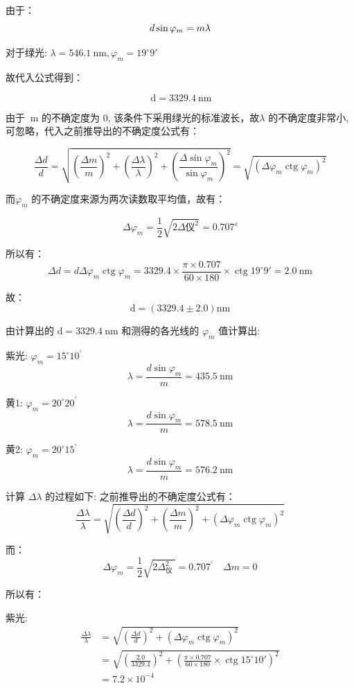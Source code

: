 \documentclass[UTF8]{ctexart}
\begin{document}
由于：
$$
d \sin \varphi_{m}=m \lambda \\
$$

对于绿光: $ \lambda=546.1 \mathrm{~nm}, \varphi_{m}=19^{\circ}9' $

故代入公式得到：

$$
\mathrm{~d}=3329.4 \mathrm{~nm}
$$

由于 $\mathrm{~m}$  的不确定度为  0, 该条件下采用绿光的标准波长，故$\lambda $ 的不确定度非常小, 可忽略，代入之前推导出的不确定度公式有：

$$
\frac{\Delta d}{d}=\sqrt{\left(\frac{\Delta m}{m}\right)^{2}+\left(\frac{\Delta \lambda}{\lambda}\right)^{2}+\left(\frac{\Delta \sin \varphi_{m}}{\sin \varphi_{m}}\right)^{2}}=\sqrt{\left(\Delta \varphi_{m} \operatorname{ctg} \varphi_{m}\right)^{2}}
$$

而$\varphi_m$ 的不确定度来源为两次读数取平均值，故有：

$$
\Delta \varphi_m = \frac{1}{2}\sqrt{{2\Delta \mbox{仪} }^2} = 0.707'
$$

所以有：
$$
   \Delta d=d \Delta \varphi_{m} \operatorname{ctg} \varphi_{m}=3329.4 \times \frac{\pi \times 0.707}{60 \times 180} \times \operatorname{ctg} 19^{\circ}9'=2.0 \mathrm{~nm} 
$$

故：
$$
  \mathrm{d}=(3329.4 \pm 2.0) \mathrm{nm}
$$

  由计算出的  $\mathrm{d}=3329.4 \mathrm{~nm}$  和测得的各光线的  $\varphi_{m} $ 值计算出:

  紫光: $\varphi_{m}=15^{\circ} 10^{\prime} $
  $$
  \lambda=\frac{d \sin \varphi_{m}}{m}=435.5 \mathrm{~nm}
  $$

  黄1: $\varphi_{m}=20^{\circ} 20^{\prime} $
  $$
  \lambda=\frac{d \sin \varphi_{m}}{m}=578.5 \mathrm{~nm}
  $$

  黄2: $\varphi_{m}=20^{\circ} 15^{\prime} $
  $$
  \lambda=\frac{d \sin \varphi_{m}}{m}=576.2 \mathrm{~nm}
  $$

  计算  $\Delta \lambda$  的过程如下:
  之前推导出的不确定度公式有：
   $$
   \frac{\Delta \lambda}{\lambda}=\sqrt{\left(\frac{\Delta d}{d}\right)^{2}+\left(\frac{\Delta m}{m}\right)^{2}+\left(\Delta \varphi_{m} \operatorname{ctg} \varphi_{m}\right)^{2}} 
   $$

   而：
   $$
   \Delta \varphi_{m}=\frac{1}{2} \sqrt{2 \Delta_{\text {仪 }}^{2}}=0.707^{\prime} \quad \Delta m=0
   $$
 
   所以有：
  
   紫光: 
   \begin{align}
    \frac{\Delta \lambda}{\lambda}&=\sqrt{\left(\frac{\Delta d}{d}\right)^{2}+\left(\Delta \varphi_{m} \operatorname{ctg} \varphi_{m}\right)^{2}}  \nonumber \\
    & = \sqrt{\left(\frac{2.0}{3329.4}\right)^{2}+\left(\frac{\pi \times 0.707}{60 \times 180} \times \operatorname{ctg} 15^{\circ}10'\right)^{2}} \nonumber \\
    & = 7.2 \times 10^{-4} \nonumber
   \end{align}
\end{document}
